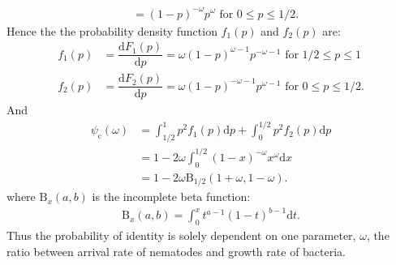 \documentclass[10pt]{article}
\newcommand{\ud}{{\mathrm{d}}}
\newcommand{\psic}{\psi_\mathrm{c}}
\begin{document}
\begin{boxframe}
\begin{multicols}{2}
\begin{align}
  &= (1-p)^{-\omega} p^\omega \text{ for } 0 \leq p \leq 1/2.
  \end{align}
  Hence the the probability density function $f_1(p)$ and $f_2(p)$ are:
  \begin{align}
  f_1(p) &= \dfrac{ \ud F_1(p) }{ \ud p} =  \omega (1-p)^{\omega-1} p^{-\omega-1}  \text{ for } 1/2 \leq p \leq 1\\
  f_2(p) &= \dfrac{ \ud F_2(p) }{ \ud p} =  \omega (1-p)^{-\omega-1} p^{\omega-1} \text{ for } 0 \leq p \leq 1/2.
  \end{align}
  And 
  \begin{align}
  \psic (\omega)&= \int_{1/2}^{1} p^2 f_1(p) \ud p + \int_{0}^{1/2} p^2 f_2(p) \ud p \\
  &= 1 -2  \omega \int_{0}^{1/2}  (1-x)^{-\omega} x^{\omega}  \ud x \\
  &= 1- 2 \omega \mathrm{B}_{1/2}(1+\omega,1-\omega). 
  \end{align}
  where $\mathrm{B}_x(a,b)$ is the incomplete beta function:
\begin{align}
\mathrm{B}_x(a,b) = \int_0^x t^{a-1}(1-t)^{b-1} \ud t.
\end{align}
  Thus the probability of identity is solely dependent on one parameter, $\omega$, the ratio between arrival rate of nematodes and growth rate of bacteria. 
 \end{multicols}
\end{boxframe}
\end{document}
